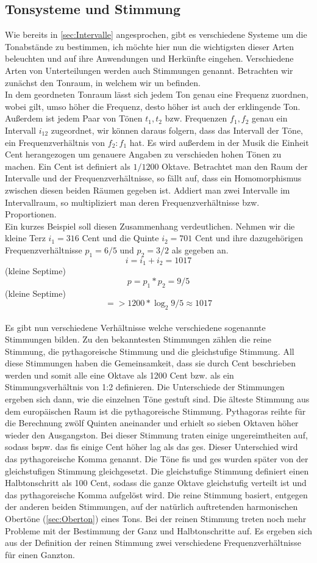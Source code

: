 \subsection*{Tonsysteme und Stimmung}
\label{sec:Tonsysteme}
Wie bereits in \ref{sec:Intervalle} angesprochen, gibt es verschiedene Systeme um die Tonabstände zu bestimmen, ich möchte hier nun die wichtigsten dieser Arten beleuchten und auf ihre Anwendungen und Herkünfte eingehen.
Verschiedene Arten von Unterteilungen werden auch Stimmungen genannt. Betrachten wir zunächst den Tonraum, in welchem wir un befinden. \\
In dem geordneten Tonraum lässt sich jedem Ton genau eine Frequenz zuordnen, wobei gilt, umso höher die Frequenz, desto höher ist auch der erklingende Ton. Außerdem ist jedem Paar von Tönen $t_1, t_2$ bzw. Frequenzen $f_1, f_2$ genau ein Intervall $i_{12}$ zugeordnet, 
wir können daraus folgern, dass das Intervall der Töne, ein Frequenzverhältnis von $f_2 : f_1$ hat. Es wird außerdem in der Musik die Einheit Cent herangezogen um genauere Angaben zu verschieden hohen Tönen zu machen. Ein Cent ist definiert als 
$1/1200$ Oktave. Betrachtet man den Raum der Intervalle und der Frequenzverhältnisse, so fällt auf, dass ein Homomorphismus zwischen diesen beiden Räumen gegeben ist. Addiert man zwei Intervalle im Intervallraum, so multipliziert man deren Frequenzverhältnisse bzw. Proportionen. \\
Ein kurzes Beispiel soll diesen Zusammenhang verdeutlichen. Nehmen wir die kleine Terz $i_1 =  316$ Cent und die Quinte $i_2 =  701$ Cent und ihre dazugehörigen Frequenzverhältnisse $p_1 = 6/5$ und $p_2 = 3/2$ als gegeben an.
$$    i = i_1 + i_2 = 1017  $$ (kleine Septime)
$$    p = p_1 * p_2 = 9/5   $$ (kleine Septime)
$$   => 1200 * \log_2{9/5} \approx 1017     $$
\\
Es gibt nun verschiedene Verhältnisse welche verschiedene sogenannte Stimmungen bilden. Zu den bekanntesten Stimmungen zählen die reine Stimmung, die pythagoreische Stimmung und die gleichstufige Stimmung.
All diese Stimmungen haben die Gemeinsamkeit, dass sie durch Cent beschrieben werden und somit alle eine Oktave als 1200 Cent bzw. als ein Stimmungsverhältnis von 1:2 definieren. Die Unterschiede der Stimmungen ergeben sich dann, wie die einzelnen
Töne gestuft sind. Die älteste Stimmung aus dem europäischen Raum ist die pythagoreische Stimmung. Pythagoras reihte für die Berechnung zwölf Quinten aneinander und erhielt so sieben Oktaven höher wieder den Ausgangston. Bei dieser Stimmung traten einige 
ungereimtheiten auf, sodass bspw. das fis einige Cent höher lag als das ges. Dieser Unterschied wird das pythagoreische Komma genannt. Die Töne fis und ges wurden später von der gleichstufigen Stimmung gleichgesetzt. Die gleichstufige Stimmung definiert einen Halbtonschritt als 100 Cent, sodass die ganze Oktave gleichstufig verteilt ist und das
pythagoreische Komma aufgelöst wird. Die reine Stimmung basiert, entgegen der anderen beiden Stimmungen, auf der natürlich auftretenden harmonischen Obertöne (\ref{sec:Oberton}) eines Tons. Bei der reinen Stimmung treten noch mehr Probleme mit der Bestimmung der Ganz und Halbtonschritte auf. Es ergeben sich aus der Definition der reinen Stimmung zwei verschiedene Frequenzverhältnisse für einen Ganzton. \cite{abcmusik}


